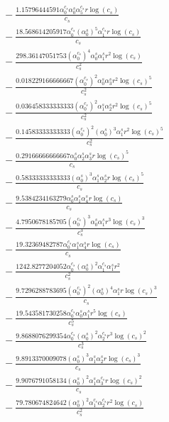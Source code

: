 \documentclass[10pt]{article}
\begin{document}
\begin{align*}
&{}  - \frac{1.15796444591 \alpha_{0}^{c_s} \alpha_{0}^s \alpha_{5}^{c_s} r \log{\left(c_{s} \right)}}{c_{s}} \\
&{}  - \frac{18.568614205917 \alpha_{0}^{c_s} \left(\alpha_{0}^s\right)^{5} \alpha_{1}^{c_s} r \log{\left(c_{s} \right)}}{c_{s}} \\
&{}  - \frac{298.36147051753 \left(\alpha_{0}^{c_s}\right)^{4} \alpha_{0}^s \alpha_{1}^s r^{2} \log{\left(c_{s} \right)}}{c_{s}^{2}} \\
&{}  - \frac{0.018229166666667 \left(\alpha_{0}^{c_s}\right)^{2} \alpha_{0}^s \alpha_{3}^s r^{2} \log{\left(c_{s} \right)}^{5}}{c_{s}^{2}} \\
&{}  - \frac{0.036458333333333 \left(\alpha_{0}^{c_s}\right)^{2} \alpha_{1}^s \alpha_{2}^s r^{2} \log{\left(c_{s} \right)}^{5}}{c_{s}^{2}} \\
&{}  - \frac{0.14583333333333 \left(\alpha_{0}^{c_s}\right)^{2} \left(\alpha_{0}^s\right)^{3} \alpha_{1}^s r^{2} \log{\left(c_{s} \right)}^{5}}{c_{s}^{2}} \\
&{}  - \frac{0.29166666666667 \alpha_{0}^s \alpha_{2}^s \alpha_{3}^s r \log{\left(c_{s} \right)}^{5}}{c_{s}} \\
&{}  - \frac{0.58333333333333 \left(\alpha_{0}^s\right)^{3} \alpha_{1}^s \alpha_{2}^s r \log{\left(c_{s} \right)}^{5}}{c_{s}} \\
&{}  - \frac{9.5384234163279 \alpha_{0}^s \alpha_{1}^s \alpha_{4}^s r \log{\left(c_{s} \right)}}{c_{s}} \\
&{}  - \frac{4.7950678185705 \left(\alpha_{0}^{c_s}\right)^{3} \alpha_{0}^s \alpha_{1}^s r^{3} \log{\left(c_{s} \right)}^{3}}{c_{s}^{3}} \\
&{}  - \frac{19.32369482787 \alpha_{0}^{c_s} \alpha_{1}^s \alpha_{4}^s r \log{\left(c_{s} \right)}}{c_{s}} \\
&{}  - \frac{1242.8277204052 \alpha_{0}^{c_s} \left(\alpha_{0}^s\right)^{2} \alpha_{1}^{c_s} \alpha_{1}^s r^{2}}{c_{s}^{2}} \\
&{}  - \frac{9.7296288783695 \left(\alpha_{0}^{c_s}\right)^{2} \left(\alpha_{0}^s\right)^{4} \alpha_{1}^s r \log{\left(c_{s} \right)}^{3}}{c_{s}} \\
&{}  - \frac{19.543581730258 \alpha_{0}^{c_s} \alpha_{0}^s \alpha_{1}^s r^{5} \log{\left(c_{s} \right)}}{c_{s}^{5}} \\
&{}  - \frac{9.8688076299354 \alpha_{0}^{c_s} \left(\alpha_{0}^s\right)^{2} \alpha_{2}^{c_s} r^{3} \log{\left(c_{s} \right)}^{2}}{c_{s}^{3}} \\
&{}  - \frac{9.8913370009078 \left(\alpha_{0}^s\right)^{3} \alpha_{1}^s \alpha_{2}^s r \log{\left(c_{s} \right)}^{3}}{c_{s}} \\
&{}  - \frac{9.9076791058134 \left(\alpha_{0}^s\right)^{2} \alpha_{1}^s \alpha_{3}^{c_s} r \log{\left(c_{s} \right)}^{2}}{c_{s}} \\
&{}  - \frac{79.780674824642 \left(\alpha_{0}^s\right)^{2} \alpha_{1}^{c_s} \alpha_{2}^{c_s} r^{2} \log{\left(c_{s} \right)}}{c_{s}^{2}}
\end{align*}
\end{document}
